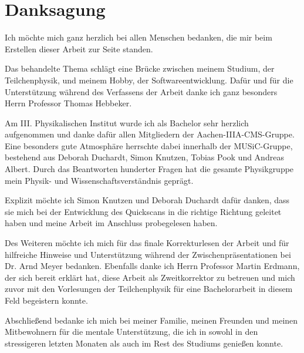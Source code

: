 
\chapter*{Danksagung}
Ich möchte mich ganz herzlich bei allen Menschen bedanken, die mir beim Erstellen dieser Arbeit zur Seite standen. 

Das behandelte Thema schlägt eine Brücke zwischen meinem Studium, der Teilchenphysik, und meinem Hobby, der Softwareentwicklung. Dafür und für die Unterstützung während des Verfassens der Arbeit danke ich ganz besonders Herrn Professor Thomas Hebbeker.

Am III. Physikalischen Institut wurde ich als Bachelor sehr herzlich aufgenommen und danke dafür allen Mitgliedern der Aachen-IIIA-CMS-Gruppe. Eine besonders gute Atmosphäre herrschte dabei innerhalb der MUSiC-Gruppe, bestehend aus Deborah Duchardt, Simon Knutzen, Tobias Pook und Andreas Albert. Durch das Beantworten hunderter Fragen hat die gesamte Physikgruppe mein Physik- und Wissenschaftsverständnis geprägt.

Explizit möchte ich Simon Knutzen und Deborah Duchardt dafür danken, dass sie mich bei der Entwicklung des Quickscans in die richtige Richtung geleitet haben und meine Arbeit im Anschluss probegelesen haben.

Des Weiteren möchte ich mich für das finale Korrekturlesen der Arbeit und für hilfreiche Hinweise und Unterstützung während der Zwischenpräsentationen bei Dr. Arnd Meyer bedanken. Ebenfalls danke ich Herrn Professor Martin Erdmann, der sich bereit erklärt hat, diese Arbeit als Zweitkorrektor zu betreuen und mich zuvor mit den Vorlesungen der Teilchenphysik für eine Bachelorarbeit in diesem Feld begeistern konnte.

Abschließend bedanke ich mich bei meiner Familie, meinen Freunden und meinen Mitbewohnern für die mentale Unterstützung, die ich in sowohl in den stressigeren letzten Monaten als auch im Rest des Studiums genießen konnte.

